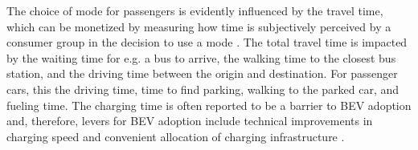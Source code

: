 \documentclass[preprint,review,11pt, authoryear]{elsarticle}
\begin{document}
    The choice of mode for passengers is evidently influenced by the travel time, which can be monetized by measuring how time is subjectively perceived by a consumer group in the decision to use a mode \citep{TATTINI2018265}. The total travel time is impacted by the waiting time for e.g. a bus to arrive, the walking time to the closest bus station, and the driving time between the origin and destination. For passenger cars, this  the driving time, time to find parking,  walking to the parked car, and fueling time. The charging time is often reported to be a barrier to BEV adoption and, therefore, levers for BEV adoption include technical improvements in charging speed and convenient allocation of charging infrastructure \citep{BERKELEY2017320, PAMIDIMUKKALA2024100153}.
\end{document}
